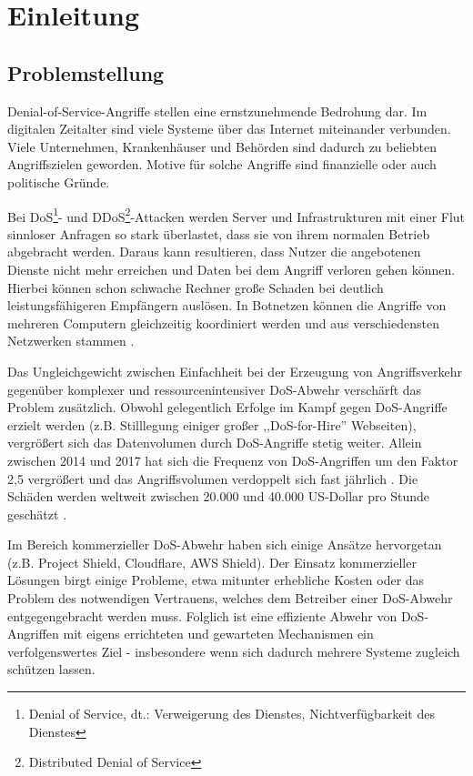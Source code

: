 \documentclass[../review_2.tex]{subfiles}
\begin{document}
    
    \chapter{Einleitung}\thispagestyle{fancy}
    
    \section{Problemstellung}
    Denial-of-Service-Angriffe stellen eine ernstzunehmende Bedrohung dar.
     Im digitalen Zeitalter sind viele Systeme über das Internet miteinander verbunden. Viele Unternehmen, Krankenhäuser und Behörden sind dadurch zu beliebten Angriffszielen geworden\cite{infopoint_security_cyber_angriffe}. Motive für solche Angriffe sind finanzielle oder auch politische Gründe.
    
    Bei DoS\footnote{Denial of Service, dt.: Verweigerung des Dienstes, Nichtverfügbarkeit des Dienstes}- und DDoS\footnote{Distributed Denial of Service}-Attacken werden Server und Infrastrukturen mit einer Flut sinnloser Anfragen so stark überlastet, dass sie von ihrem normalen Betrieb abgebracht werden. Daraus kann resultieren, dass Nutzer die angebotenen Dienste nicht mehr erreichen und Daten bei dem Angriff verloren gehen können.
    Hierbei können schon schwache Rechner große Schaden bei deutlich leistungsfähigeren Empfängern auslösen. In Botnetzen können die Angriffe von mehreren Computern gleichzeitig koordiniert werden und aus verschiedensten Netzwerken stammen \cite{tecchannel_gefahr_botnet}.
    
    Das Ungleichgewicht zwischen Einfachheit bei der Erzeugung von Angriffsverkehr gegenüber komplexer und ressourcenintensiver DoS-Abwehr verschärft das Problem zusätzlich. Obwohl gelegentlich Erfolge im Kampf gegen DoS-Angriffe erzielt werden (z.B. Stilllegung einiger großer ,,DoS-for-Hire'' Webseiten), vergrößert sich das Datenvolumen durch DoS-Angriffe stetig weiter. Allein zwischen 2014 und 2017 hat sich die Frequenz von DoS-Angriffen um den Faktor 2,5 vergrößert und das Angriffsvolumen verdoppelt sich fast jährlich \cite{neustar_ddos_report}. Die Schäden werden weltweit zwischen 20.000 und 40.000 US-Dollar pro Stunde geschätzt \cite{datacenterknowledge_study}.
    
    Im Bereich kommerzieller DoS-Abwehr haben sich einige Ansätze hervorgetan (z.B. Project Shield\cite{projectshield}, Cloudflare\cite{cloudflare}, AWS Shield\cite{aws_shield}). Der Einsatz kommerzieller Lösungen birgt einige Probleme, etwa mitunter erhebliche Kosten oder das Problem des notwendigen Vertrauens, welches dem Betreiber einer DoS-Abwehr entgegengebracht werden muss. Folglich ist eine effiziente Abwehr von DoS-Angriffen mit eigens errichteten und gewarteten Mechanismen ein verfolgenswertes Ziel - insbesondere wenn sich dadurch mehrere Systeme zugleich schützen lassen.
    
\end{document}
